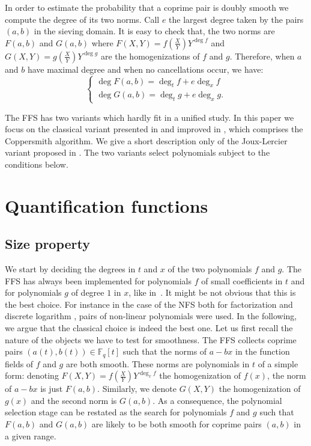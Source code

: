 \documentclass[a4wide]{article}
\newcommand{\F}{{\mathbb F}}
\theoremstyle{plain}
\theoremstyle{definition}
\theoremstyle{remark}
\begin{document}
In order to estimate the probability that a coprime pair is doubly smooth we
compute the degree of its two norms. Call $e$ the largest degree taken by
the pairs $(a,b)$ in the sieving domain. It is easy to
check that, the two norms are $F(a,b)$ and $G(a,b)$ where
$F(X,Y)=f(\frac{X}{Y})Y^{\deg f}$ and $G(X,Y)=g(\frac{X}{Y})Y^{\deg g}$ are
the homogenizations of $f$ and $g$. Therefore, when $a$ and $b$ have maximal
degree and when no cancellations occur, we have:
\begin{equation}\label{deg}
	\left\{ \begin{array}{l}
			\deg F(a,b)=\deg_t f+e\deg_xf\\
			\deg G(a,b)=\deg_t g+e\deg_x g.
 	   \end{array}
\right.
\end{equation}


The FFS has two variants which hardly fit in a unified study. In this
paper we focus on the classical variant presented in \cite{AdHu99} and improved
in \cite{JoLe02}, which comprises the Coppersmith algorithm. We give a short
description only of the Joux-Lercier variant proposed in \cite{JoLe06}. The two variants select polynomials subject to the conditions below.


\fi

\section{Quantification functions}\label{sec:functions}

\subsection{Size property}

We start by deciding the degrees in $t$ and $x$ of the two polynomials
$f$ and $g$. The FFS has always been implemented for polynomials $f$ of
small coefficients in $t$ and for polynomials $g$ of degree $1$ in $x$,
like in~\cite{JoLe02}. It might be not obvious that this is the best
choice. For instance in the case of the NFS both for factorization
\cite{Montgomery,PrZi11} and discrete logarithm
\cite{JoLe03}, pairs of non-linear polynomials were used. 
In the following, we argue that the classical choice is indeed the best
one.
\medskip
Let us first recall the nature of the objects we have to test for
smoothness. The FFS collects coprime pairs $(a(t),b(t))\in \F_q[t]$ such
that the norms of $a-bx$ in the function fields of $f$ and $g$
are both smooth. These norms are polynomials in $t$ of a simple form:
denoting $F(X,Y)=f(\frac{X}{Y})Y^{\deg_x f}$ the homogenization of
$f(x)$, the norm of $a-bx$ is just $F(a,b)$. Similarly, we denote
$G(X,Y)$ the homogenization of $g(x)$ and the second norm is $G(a,b)$.
As a consequence, the polynomial selection stage can be restated as the
search for polynomials $f$ and $g$ such that $F(a,b)$ and $G(a,b)$ are
likely to be both smooth for coprime pairs $(a,b)$ in a given range.
\end{document}
